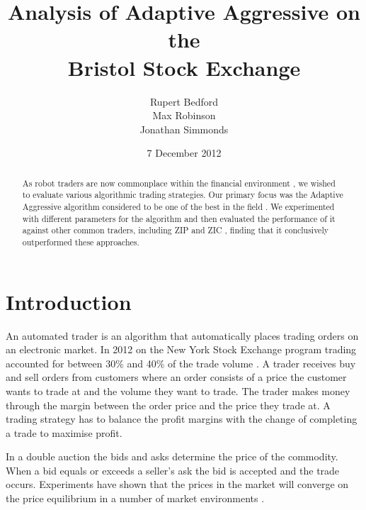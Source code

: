 \documentclass[preprint]{acm_proc_article-sp} %
\begin{document}
\title{Analysis of Adaptive Aggressive on the\\
Bristol Stock Exchange}
\author{
  \alignauthor
    Rupert Bedford\\
  \alignauthor
    Max Robinson\\
  \alignauthor
    Jonathan Simmonds
}
\date{7 December 2012}

\maketitle
\begin{abstract}
As robot traders are now commonplace within the financial environment
\cite{nyse_press}, we
wished to evaluate various algorithmic trading strategies. Our primary focus was
the  Adaptive Aggressive algorithm considered to be one of the
best in the field \cite{AA_thesis}. We experimented with different parameters for the algorithm
and then evaluated the performance of it against other common traders,
including ZIP and ZIC \cite{ZIP_paper1}, finding that it conclusively
outperformed these approaches.\\
\end{abstract}

\section{Introduction} \label{sec:introduction}

An automated trader is an algorithm that automatically places trading orders on
an electronic market. In 2012 on the New York Stock Exchange program trading accounted for between 
30\% and 40\% of the trade volume \cite{nyse_press}.
A trader receives buy and sell orders from customers where an order consists of a price the customer 
wants to trade at and the volume they want to trade.
The trader makes money through the margin between the order price and the price they trade at.
A trading strategy has to balance the profit margins with the change of completing a trade to maximise profit.

In a double auction the bids and asks determine the price of the commodity.
When a bid equals or exceeds a seller's ask the bid is accepted and the trade
occurs. Experiments have shown  that the prices in the market will
 converge on the price equilibrium in a number of market
environments \cite{smith_1962}.
\end{document}
